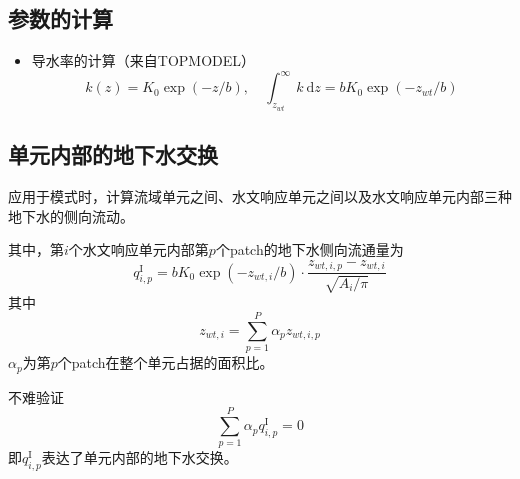 \subsection{参数的计算}
\begin{itemize}
\item 导水率的计算（来自TOPMODEL）
\begin{equation}
k(z) = K_0\exp{(- z/b)},\quad \int^\infty_{z_{wt}} k\ \mathrm{d}z = b K_0\exp{(-z_{wt}/b)}
\end{equation}
\end{itemize}


\subsection{单元内部的地下水交换}
应用于模式时，计算流域单元之间、水文响应单元之间以及水文响应单元内部三种地下水的侧向流动。

其中，第$i$个水文响应单元内部第$p$个patch的地下水侧向流通量为
\begin{equation}
q^{\mathrm{I}}_{i,p} = b K_0 \exp{(-z_{wt,i}/b)}\cdot\frac{z_{wt,i,p}-z_{wt,i}}{\sqrt{A_i/\pi}}
\end{equation}
其中
$$z_{wt,i} = \sum^P_{p=1} \alpha_p z_{wt,i,p}$$
$\alpha_p$为第$p$个patch在整个单元占据的面积比。

不难验证
$$\sum^P_{p=1} \alpha_p q^{\mathrm{I}}_{i,p} =0$$
即$q^{\mathrm{I}}_{i,p}$表达了单元内部的地下水交换。





